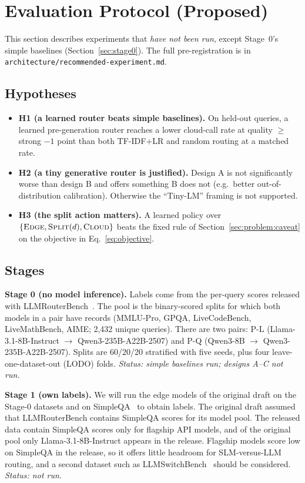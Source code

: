 \documentclass[lettersize,journal]{IEEEtran}
\begin{document}
\section{Evaluation Protocol (Proposed)}
\label{sec:protocol}
This section describes experiments that \emph{have not been run}, except
Stage~0's simple baselines (Section~\ref{sec:stage0}). The full pre-registration
is in \texttt{architecture/recommended-experiment.md}.

\subsection{Hypotheses}
\begin{itemize}
\item \textbf{H1 (a learned router beats simple baselines).} On held-out queries,
a learned pre-generation router reaches a lower cloud-call rate at quality
$\ge$ strong $-1$ point than both TF-IDF+LR and random routing at a matched
rate.
\item \textbf{H2 (a tiny generative router is justified).} Design A is not
significantly worse than design B and offers something B does not (e.g.\ better
out-of-distribution calibration). Otherwise the ``Tiny-LM'' framing is not
supported.
\item \textbf{H3 (the split action matters).} A learned policy over
$\{\textsc{Edge},\textsc{Split}(d),\textsc{Cloud}\}$ beats the fixed rule of
Section~\ref{sec:problem:caveat} on the objective in Eq.~\eqref{eq:objective}.
\end{itemize}

\subsection{Stages}
\textbf{Stage 0 (no model inference).} Labels come from the per-query scores
released with LLMRouterBench~\cite{li2026llmrouterbench,llmrouterbench2025repo}.
The pool is the binary-scored splits for which both models in a pair have
records (MMLU-Pro, GPQA, LiveCodeBench, LiveMathBench, AIME; 2,432 unique
queries). There are two pairs: P-L (Llama-3.1-8B-Instruct $\rightarrow$
Qwen3-235B-A22B-2507) and P-Q (Qwen3-8B $\rightarrow$ Qwen3-235B-A22B-2507).
Splits are 60/20/20 stratified with five seeds, plus four leave-one-dataset-out
(LODO) folds. \emph{Status: simple baselines run; designs A--C not run.}

\textbf{Stage 1 (own labels).} We will run the edge models of the original
draft on the Stage-0 datasets and on SimpleQA~\cite{wei2024measuring} to obtain
labels. The original draft assumed that LLMRouterBench contains SimpleQA scores
for its model pool. The released data contain SimpleQA scores only for
flagship API models, and of the original pool only Llama-3.1-8B-Instruct appears
in the release. Flagship models score low on SimpleQA in the release, so it offers
little headroom for SLM-versus-LLM routing, and a second dataset such as
LLMSwitchBench~\cite{liu2025llmswitchbench} should be considered. \emph{Status:
not run.}
\end{document}
